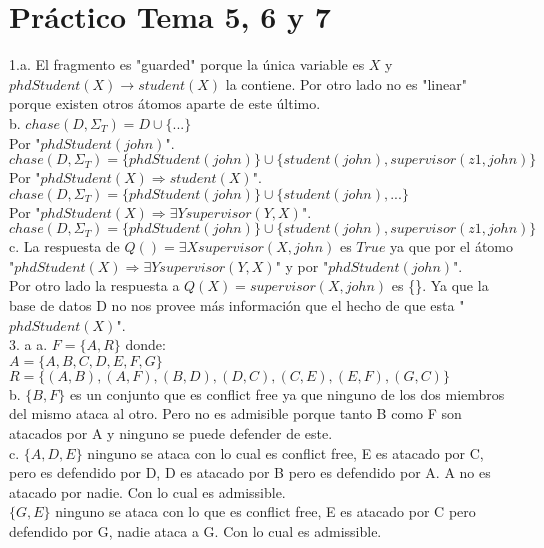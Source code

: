 \chapter{Práctico Tema 5, 6 y 7}

1.a. El fragmento es "guarded" porque la única variable es $X$ y $phdStudent(X) → student(X)$ la contiene. Por otro lado no es "linear" porque existen otros átomos aparte de este último. \\

b. $chase(D, \Sigma_{T}) = D \cup \{...\}$ \\

Por "$phdStudent(john)$".\\

$chase(D, \Sigma_{T}) = \{phdStudent(john)\} \cup \{student(john), supervisor(z1, john) \}$ \\

Por "$phdStudent(X) \Longrightarrow student(X)$". \\

$chase(D, \Sigma_{T}) = \{phdStudent(john)\} \cup \{student(john), ...\}$\\

Por "$phdStudent(X) \Longrightarrow \exists Y supervisor(Y, X)$". \\

$chase(D, \Sigma_{T}) = \{phdStudent(john)\} \cup \{student(john), supervisor(z1, john) \}$ \\

c. La respuesta de $Q() = \exists X supervisor(X, john)$ es $True$ ya que por el átomo "$phdStudent(X) \Longrightarrow \exists Y supervisor(Y, X)$" y por "$phdStudent(john)$". \\

Por otro lado la respuesta a $Q(X) = supervisor(X, john)$ es \{\}. Ya que la base de datos D no nos provee más información que el hecho de que 
esta "$phdStudent(X)$". \\


3. a
a. $F=\{A, R\}$ donde: \\
$A=\{A, B, C, D, E, F, G\}$ \\
$R=\{(A, B), (A, F), (B, D), (D, C), (C, E), (E, F), (G, C)\}$ \\

b. $\{B, F\}$ es un conjunto que es conflict free ya que ninguno de los dos miembros del mismo ataca al otro. Pero no es admisible porque tanto B como F son atacados por A y ninguno se puede defender de este.\\

c. $\{A, D, E\}$ ninguno se ataca con lo cual es conflict free, E es atacado por C, pero es defendido por D, D es atacado por B pero es defendido por A. A no es atacado por nadie. Con lo cual es admissible. \\

$\{G, E\}$ ninguno se ataca con lo que es conflict free, E es atacado por C pero defendido por G, nadie ataca a G. Con lo cual es admissible.

\bigskip